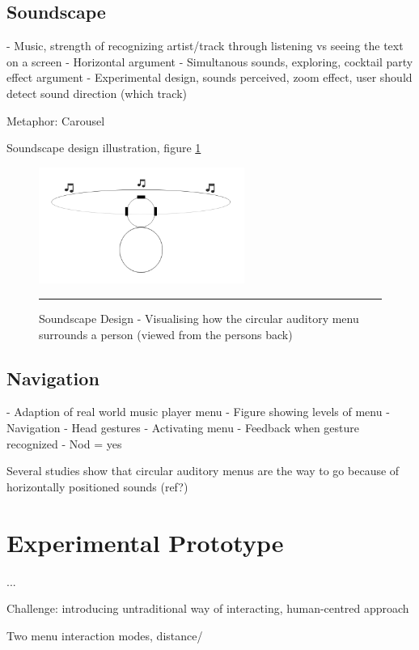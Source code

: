 \subsection{Soundscape}
- Music, strength of recognizing artist/track through listening vs seeing the text on a screen
- Horizontal argument
- Simultanous sounds, exploring, cocktail party effect argument
- Experimental design, sounds perceived, zoom effect, user should detect sound direction (which track)

Metaphor: Carousel

Soundscape design illustration, figure \ref{fig:sounddesign}

\begin{figure}[t]
	\centering
		\includegraphics[width=0.6\textwidth,height=\textheight,keepaspectratio]{./Figures/sounddesign.png}
		\rule{35em}{0.5pt}
	\caption[Soundscape Design]{Soundscape Design - Visualising how the circular auditory menu surrounds a person (viewed from the persons back)}
	\label{fig:sounddesign}
\end{figure}

\subsection{Navigation}
- Adaption of real world music player menu
- Figure showing levels of menu
- Navigation
- Head gestures
- Activating menu
- Feedback when gesture recognized
- Nod = yes

Several studies show that circular auditory menus are the way to go because of horizontally positioned sounds (ref?)


\section{Experimental Prototype}
...

Challenge: introducing untraditional way of interacting, human-centred approach

Two menu interaction modes, distance/


























